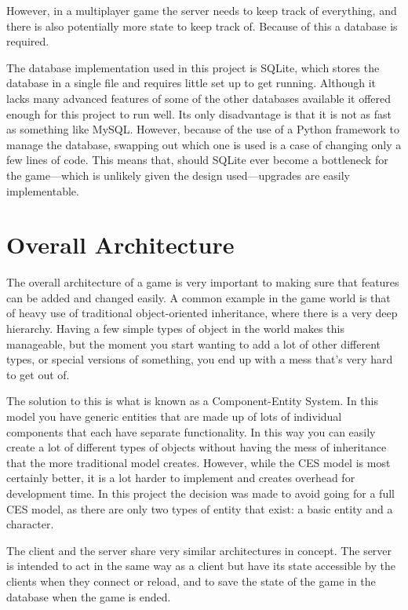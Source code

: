 However, in a multiplayer game the server needs to keep track of everything, and there is also potentially more state to keep track of. Because of this a database is required.

The database implementation used in this project is SQLite, which stores the database in a single file and requires little set up to get running. Although it lacks many advanced features of some of the other databases available it offered enough for this project to run well. Its only disadvantage is that it is not as fast as something like MySQL. However, because of the use of a Python framework to manage the database, swapping out which one is used is a case of changing only a few lines of code. This means that, should SQLite ever become a bottleneck for the game---which is unlikely given the design used---upgrades are easily implementable.

\section{Overall Architecture}
The overall architecture of a game is very important to making sure that features can be added and changed easily. A common example in the game world is that of heavy use of traditional object-oriented inheritance, where there is a very deep hierarchy. Having a few simple types of object in the world makes this manageable, but the moment you start wanting to add a lot of other different types, or special versions of something, you end up with a mess that's very hard to get out of.

The solution to this is what is known as a Component-Entity System. In this model you have generic entities that are made up of lots of individual components that each have separate functionality. In this way you can easily create a lot of different types of objects without having the mess of inheritance that the more traditional model creates. However, while the CES model is most certainly better, it is a lot harder to implement and creates overhead for development time. In this project the decision was made to avoid going for a full CES model, as there are only two types of entity that exist: a basic entity and a character.

The client and the server share very similar architectures in concept. The server is intended to act in the same way as a client but have its state accessible by the clients when they connect or reload, and to save the state of the game in the database when the game is ended.

